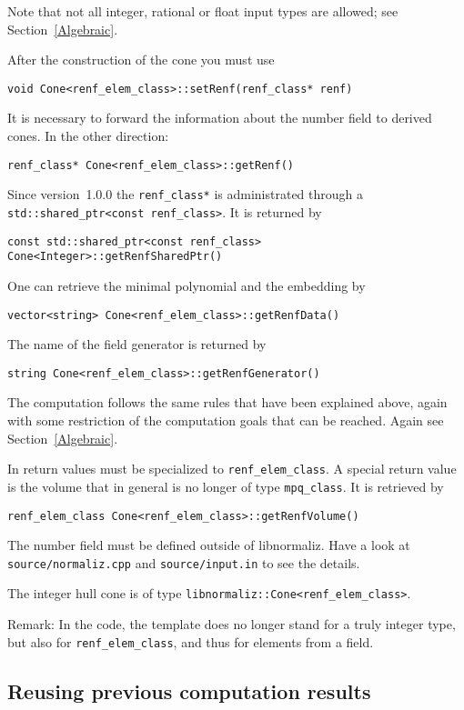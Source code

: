 \begin{small}
Note that not all integer, rational or float input types are allowed; see Section~\ref{Algebraic}.

After the construction of the cone you must use
\begin{Verbatim}
void Cone<renf_elem_class>::setRenf(renf_class* renf)
\end{Verbatim}
It is necessary to forward the information about the number field to derived cones. In the other direction:
\begin{Verbatim}
renf_class* Cone<renf_elem_class>::getRenf()
\end{Verbatim}
Since version~1.0.0 the \verb|renf_class*| is administrated through a \verb|std::shared_ptr<const renf_class>|. It is returned by
\begin{Verbatim}
const std::shared_ptr<const renf_class> Cone<Integer>::getRenfSharedPtr()
\end{Verbatim}

One can retrieve the minimal polynomial and the embedding by
\begin{Verbatim}
vector<string> Cone<renf_elem_class>::getRenfData()
\end{Verbatim}
The name of the field generator is returned by
\begin{Verbatim}
string Cone<renf_elem_class>::getRenfGenerator()
\end{Verbatim}

The computation follows the same rules that have been explained above, again with some restriction of the computation goals that can be reached. Again see Section~\ref{Algebraic}.

In return values  must be specialized to \verb|renf_elem_class|. A special return value is the volume that in general is no longer of type \verb|mpq_class|. It is retrieved by
\begin{Verbatim}
renf_elem_class Cone<renf_elem_class>::getRenfVolume() 
\end{Verbatim}

The number field must be defined outside of libnormaliz. Have a look at \verb|source/normaliz.cpp| and \verb|source/input.in| to see the details.

The integer hull cone is of type \verb|libnormaliz::Cone<renf_elem_class>|.

Remark: In the code, the template  does no longer stand for a truly integer type, but also for \verb|renf_elem_class|, and thus for elements from a field.

\subsection{Reusing previous computation results}


\end{small}
